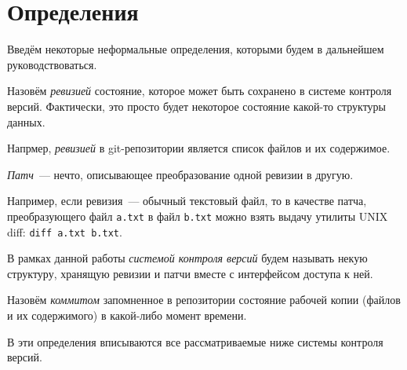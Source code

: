 

\section{Определения}

Введём некоторые неформальные определения, которыми будем в дальнейшем
руководствоваться. 

\begin{definition}[Ревизия]
  Назовём \emph{ревизией} состояние, которое может быть сохранено в
  системе контроля версий. Фактически, это просто будет некоторое
  состояние какой-то структуры данных.
\end{definition}

Напрмер, \emph{ревизией} в git-репозитории является список файлов и их
содержимое. 

\begin{definition}[Патч]
  \emph{Патч}~--- нечто, описывающее преобразование одной ревизии в
  другую.
\end{definition}

Например, если ревизия~--- обычный текстовый файл, то в качестве
патча, преобразующего файл \texttt{a.txt} в файл \texttt{b.txt} можно
взять выдачу утилиты UNIX diff: \texttt{diff a.txt b.txt}. 

\begin{definition}
  В рамках данной работы \emph{системой контроля версий} будем
  называть некую структуру, хранящую ревизии и патчи вместе с
  интерфейсом доступа к ней.
\end{definition}

\begin{definition}[Коммит]
  Назовём \emph{коммитом} запомненное в репозитории состояние рабочей
  копии (файлов и их содержимого) в какой-либо момент времени.
\end{definition}

В эти определения вписываются все рассматриваемые ниже системы контроля
версий. 

